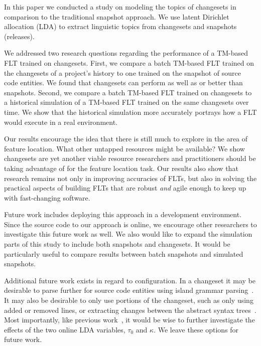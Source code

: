 
In this paper we conducted a study on modeling the topics of changesets in
comparison to the traditional snapshot approach.  We use latent Dirichlet
allocation (LDA) to extract linguistic topics from changesets and snapshots
(releases).

We addressed two research questions regarding the performance of a TM-based FLT
trained on changesets.  First, we compare a batch TM-based FLT trained on the
changesets of a project's history to one trained on the snapshot of source code
entities.  We found that changesets can perform as well as or better than
snapshots.  Second, we compare a batch TM-based FLT trained on changesets to
a historical simulation of a TM-based FLT trained on the same changesets over
time.  We show that the historical simulation more accurately portrays how a FLT
would execute in a real environment.

Our results encourage the idea that there is still much to explore in the area
of feature location. What other untapped resources might be available? We show
changesets are yet another viable resource researchers and practitioners should
be taking advantage of for the feature location task.  Our results also show
that research remains not only in improving accuracies of FLTs, but also in
solving the practical aspects of building FLTs that are robust \emph{and} agile
enough to keep up with fast-changing software.

Future work includes deploying this approach in a development environment.  Since
the source code to our approach is online, we encourage other researchers to
investigate this future work as well.  We also would like to expand the simulation 
parts of this study to include both snapshots and changesets.  It would be
particularly useful to compare results between batch snapshots and simulated
snapshots. 

Additional future work exists in regard to configuration. In a changeset
it may be desirable to parse further for source code entities using
island grammar parsing~\cite{Moonen_2001}.  It may also be desirable to
only use portions of the changeset, such as only using added or removed
lines, or extracting changes between the abstract syntax
trees~\cite{Fluri-etal_2007}. Most importantly, like previous
work~\cite{Biggers-etal_2014}, it would be wise to further investigate
the effects of the two online LDA variables, $\tau_0$ and $\kappa$.  We
leave these options for future work.


